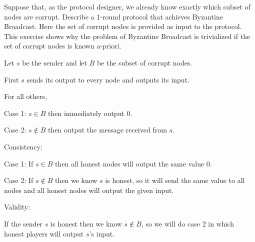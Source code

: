 \documentclass[12pt, letterpaper]{article}
\begin{document}
\begin{problem}{}
    Suppose that, as the protocol designer, we already know exactly which subset
of nodes are corrupt. Describe a 1-round protocol that achieves Byzantine Broadcast.
Here the set of corrupt nodes is provided as input to the protocol. This exercise shows
why the problem of Byzantine Broadcast is trivialized if the set of corrupt nodes is known
a-priori.
\end{problem}
\begin{problemproof}
    Let $s$ be the sender and let $B$ be the subset of corrupt nodes.

    First $s$ sends its output to every node and outputs its input.

    For all others,

    Case 1: $s \in B$ then immediately output 0.

    Case 2: $s \notin B$ then output the message received from $s$.

    Consistency:

    Case 1: If $s \in B$ then all honest nodes will output the same value 0.
    
    Case 2: If $s \notin B$ then we know $s$ is honest, so it will send the same value to all nodes and all honest nodes will output the given input.

    Validity:

    If the sender $s$ is honest then we know $s \notin B$, so we will do case 2 in which honest players will output $s$'s input.
\end{problemproof}
\end{document}
